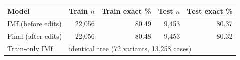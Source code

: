 \begin{tabular}{lrrrr}
\hline
Model & Train $n$ & Train exact \% & Test $n$ & Test exact \% \\
\hline
IMf (before edits) & 22,056 & 80.49 & 9,453 & 80.37 \\
Final (after edits) & 22,056 & 80.48 & 9,453 & 80.32 \\
\hline
Train-only IMf & \multicolumn{4}{l}{identical tree (72 variants, 13,258 cases)} \\
\hline
\end{tabular}
